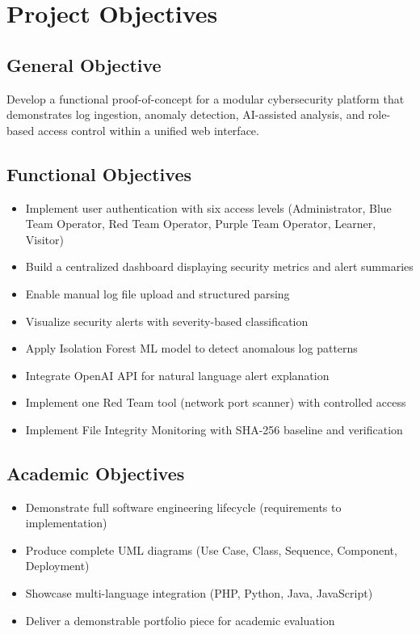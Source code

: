 \documentclass[12pt,a4paper]{report}
\begin{document}
	\chapter{Project Objectives}
	
	\section{General Objective}
	Develop a functional proof-of-concept for a modular cybersecurity platform that demonstrates log ingestion, anomaly detection, AI-assisted analysis, and role-based access control within a unified web interface.
	
	\section{Functional Objectives}
	\begin{itemize}
		\item Implement user authentication with six access levels (Administrator, Blue Team Operator, Red Team Operator, Purple Team Operator, Learner, Visitor)
		\item Build a centralized dashboard displaying security metrics and alert summaries
		\item Enable manual log file upload and structured parsing
		\item Visualize security alerts with severity-based classification
		\item Apply Isolation Forest ML model to detect anomalous log patterns
		\item Integrate OpenAI API for natural language alert explanation
		\item Implement one Red Team tool (network port scanner) with controlled access
		\item Implement File Integrity Monitoring with SHA-256 baseline and verification
	\end{itemize}
	
	\section{Academic Objectives}
	\begin{itemize}
		\item Demonstrate full software engineering lifecycle (requirements to implementation)
		\item Produce complete UML diagrams (Use Case, Class, Sequence, Component, Deployment)
		\item Showcase multi-language integration (PHP, Python, Java, JavaScript)
		\item Deliver a demonstrable portfolio piece for academic evaluation
	\end{itemize}
	
\end{document}
